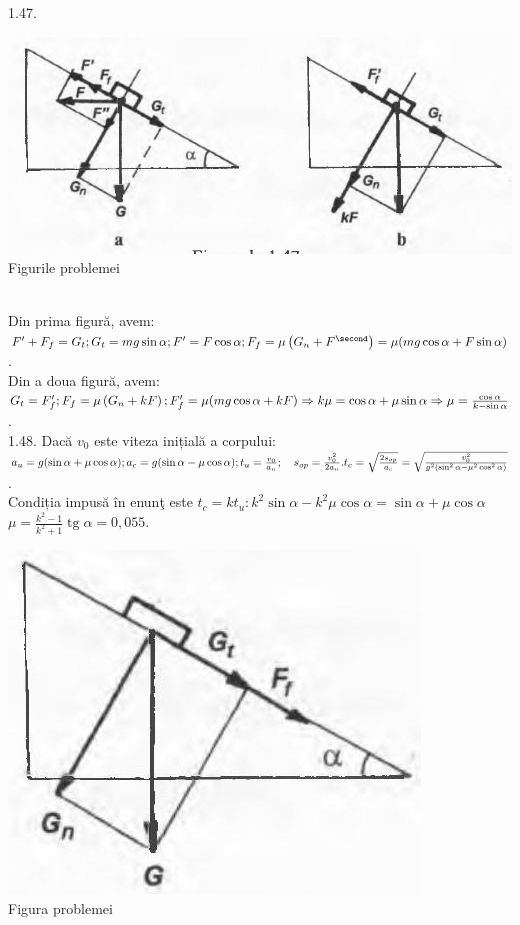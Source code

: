 1.47. \begin{center} \includegraphics[width=0.4\linewidth]{images/2025_07_01_5b3ff9fa0d508c8e9f17g-207}\\ Figurile problemei \end{center}\\ Din prima figură, avem:\\ $F^{\prime}+F_{f}=G_{t};\\ G_{t}=m g \sin \alpha;\\ F^{\prime}=F \cos \alpha;\\ F_{f}=\mu\left(G_{n}+F^{\second}\right)=\mu(m g \cos \alpha+F \sin \alpha)$.\\ Din a doua figură, avem:\\ $G_{t}=F_{f}^{\prime};\\ F_{f}=\mu\left(G_{n}+k F\right);\\ F_{f}^{\prime}=\mu(m g \cos \alpha+k F) \Rightarrow k \mu=\cos \alpha+\mu \sin \alpha \Rightarrow \mu=\frac{\cos \alpha}{k-\sin \alpha}$.\\

1.48. Dacă $v_{0}$ este viteza inițială a corpului:\\ $a_{u}=g(\sin \alpha+\mu \cos \alpha);\\ a_{c}=g(\sin \alpha-\mu \cos \alpha);\\ t_{u}=\frac{v_{0}}{a_{u}}; \quad s_{o p}=\frac{v_{0}^{2}}{2 a_{u}}.\\ t_{c}=\sqrt{\frac{2 s_{o p}}{a_{c}}}=\sqrt{\frac{v_{0}^{2}}{g^{2}\left(\sin ^{2} \alpha-\mu^{2} \cos ^{2} \alpha\right)}}$.\\ Condiția impusă în enunţ este $t_{c}=k t_{u}: k^{2} \sin \alpha-k^{2} \mu \cos \alpha=\sin \alpha+\mu \cos \alpha$\\ $\mu=\frac{k^{2}-1}{k^{2}+1} \operatorname{tg} \alpha=0,055$.\\ \begin{center} \includegraphics[width=0.4\linewidth]{images/2025_07_01_5b3ff9fa0d508c8e9f17g-207(1)}\\ Figura problemei \end{center}\\

